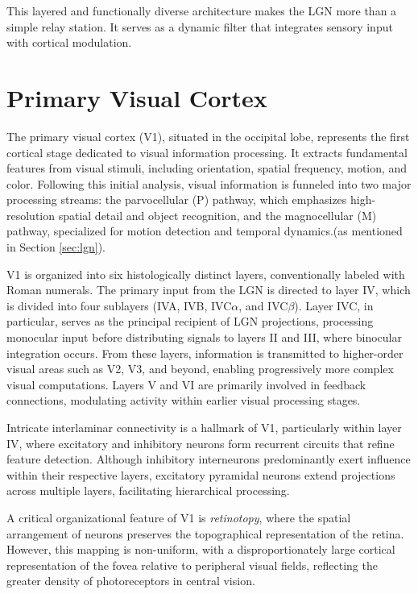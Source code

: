 This layered and functionally diverse architecture makes the LGN more than a simple relay station. It serves as a dynamic filter that integrates sensory input with cortical modulation.

\section{Primary Visual Cortex}
\label{sec:v1}

The primary visual cortex (V1), situated in the occipital lobe, represents the first cortical stage dedicated to visual information processing. It extracts fundamental features from visual stimuli, including orientation, spatial frequency, motion, and color. Following this initial analysis, visual information is funneled into two major processing streams: the parvocellular (P) pathway, which emphasizes high-resolution spatial detail and object recognition, and the magnocellular (M) pathway, specialized for motion detection and temporal dynamics.(as mentioned in Section \ref{sec:lgn}).

V1 is organized into six histologically distinct layers, conventionally labeled with
Roman numerals. The primary input from the LGN is directed to layer IV, which is divided into four sublayers (IVA, IVB, IVC$\alpha$, and IVC$\beta$). Layer IVC, 
in particular, serves as the principal recipient of LGN projections, processing
monocular input before distributing signals to layers II and III, where binocular
integration occurs. From these layers, information is transmitted to higher-order 
visual areas such as V2, V3, and beyond, enabling progressively more complex visual
computations. Layers V and VI are primarily involved in feedback connections, 
modulating activity within earlier visual processing stages.

Intricate interlaminar connectivity is a hallmark of V1, particularly within layer IV, 
where excitatory and inhibitory neurons form recurrent circuits that refine feature
detection. Although inhibitory interneurons predominantly exert influence within their
respective layers, excitatory pyramidal neurons extend projections across multiple
layers, facilitating hierarchical processing.

A critical organizational feature of V1 is \emph{retinotopy}, where the spatial
arrangement of neurons preserves the topographical representation of the retina. 
However, this mapping is non-uniform, with a disproportionately large cortical
representation of the fovea relative to peripheral visual fields, reflecting the
greater density of photoreceptors in central vision.

